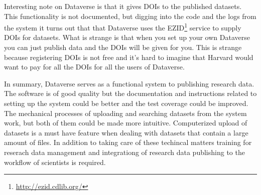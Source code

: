 Interesting note on Dataverse is that it gives DOIs to the published datasets.
This functionality is not documented, but digging into the code and the logs
from the system it turns out that that Dataverse uses the
EZID\footnote{\url{http://ezid.cdlib.org/}} service to supply DOIs for
datasets. What is strange is that when you set up your own Dataverse you
can just publish data and the DOIs will be given for you. This is strange
because registering DOIs is not free and it's hard to imagine that Harvard
would want to pay for all the DOIs for all the users of Dataverse.

In summary, Dataverse serves as a functional system to publishing research
data. The software is of good quality but the documentation and instructions
related to setting up the system could be better and the test coverage could be
improved. The mechanical processes of
uploading and searching datasets from the system work, but both of them could
be made more intuitive. Computerized upload of datasets is a must have feature
when dealing with datasets that contain a large amount of files. In addition to
taking care of these techincal matters training for reserach data management
and integrationg of research data publishing to the workflow of scientists is
required.

